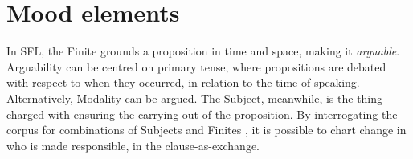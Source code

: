 


\FloatBarrier
\section{Mood elements}

In \gls{SFL}, the Finite grounds a proposition in time and space, making it \emph{arguable}. Arguability can be centred on primary tense, where propositions are debated with respect to when they occurred, in relation to the time of speaking. Alternatively, Modality can be argued. The Subject, meanwhile, is the thing charged with ensuring the carrying out of the proposition. By interrogating the \gls{corpus} for combinations of Subjects and Finites \cite[see][the \emph{Mood Block}]{eggins_introduction_2004}, it is possible to chart change in who is made responsible, in the clause\hyp{}as\hyp{}exchange.

